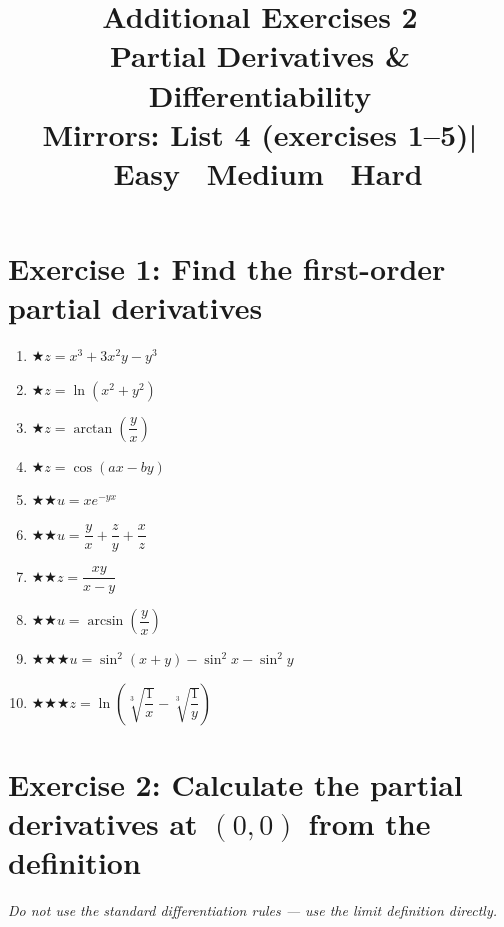 \documentclass[12pt,a4paper]{article}
\title{\textbf{Additional Exercises 2}\\
\large Partial Derivatives \& Differentiability\\[4pt]
\normalsize Mirrors: List 4 (exercises 1--5)\quad|\quad
\easy\ Easy \quad \medium\ Medium \quad \hard\ Hard}
\date{}
\newcommand{\easy}{{\color{green!60!black}$\bigstar$}}
\newcommand{\medium}{{\color{orange}$\bigstar\bigstar$}}
\newcommand{\hard}{{\color{red}$\bigstar\bigstar\bigstar$}}
\begin{document}
\maketitle
\thispagestyle{empty}

\section*{Exercise 1: Find the first-order partial derivatives}

\begin{enumerate}[leftmargin=*, label=(\alph*)]
\item \easy\quad $z = x^3 + 3x^2 y - y^3$
\item \easy\quad $z = \ln(x^2+y^2)$
\item \easy\quad $z = \arctan\!\left(\dfrac{y}{x}\right)$
\item \easy\quad $z = \cos(ax-by)$
\item \medium\quad $u = xe^{-yx}$
\item \medium\quad $u = \dfrac{y}{x}+\dfrac{z}{y}+\dfrac{x}{z}$
\item \medium\quad $z = \dfrac{xy}{x-y}$
\item \medium\quad $u = \arcsin\!\left(\dfrac{y}{x}\right)$
\item \hard\quad $u = \sin^2(x+y) - \sin^2 x - \sin^2 y$
\item \hard\quad $z = \ln\!\left(\sqrt[3]{\dfrac{1}{x}}-\sqrt[3]{\dfrac{1}{y}}\right)$
\end{enumerate}

\section*{Exercise 2: Calculate the partial derivatives at $(0,0)$ from the definition}

\emph{Do not use the standard differentiation rules --- use the limit definition directly.}
\end{document}
